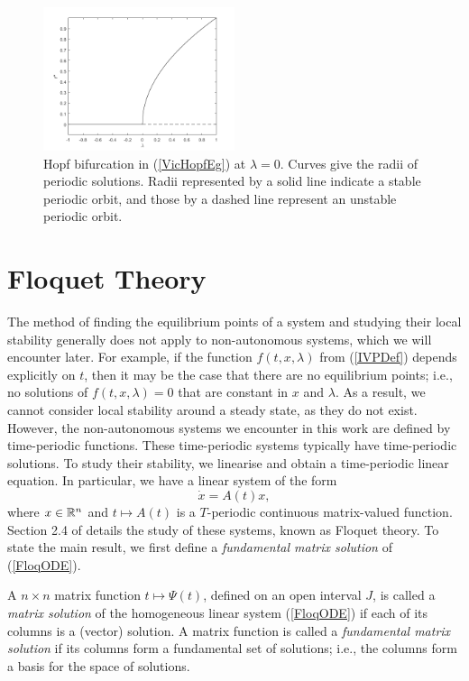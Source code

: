 \documentclass[12pt]{UOthesis}
\theoremstyle{remarkstyle}
\begin{document}
\begin{figure}[h!]
	\centering
	\includegraphics[width=0.5\textwidth]{BifH.png}
	\caption[Hopf bifurcation]{Hopf bifurcation in (\ref{VicHopfEg}) at $\lambda=0$. Curves give the radii of periodic solutions. Radii represented by a solid line indicate a stable periodic orbit, and those by a dashed line represent an unstable periodic orbit.\label{BifH}}
\end{figure}

\section{Floquet Theory}
\label{SectionFloquetTheory}
The method of finding the equilibrium points of a system and studying their local stability generally does not apply to non-autonomous systems, which we will encounter later. For example, if the function $f(t,x,\lambda)$ from (\ref{IVPDef}) depends explicitly on $t$, then it may be the case that there are no equilibrium points; i.e., no solutions of $f(t,x,\lambda)=0$ that are constant in $x$ and $\lambda$. As a result, we cannot consider local stability around a steady state, as they do not exist. However, the non-autonomous systems we encounter in this work are defined by time-periodic functions. These time-periodic systems typically have time-periodic solutions. To study their stability, we linearise and obtain a time-periodic linear equation. In particular, we have a linear system of the form
\begin{equation}
	\dot{x}=A(t)x,
	\label{FloqODE}
\end{equation}
where $x\in \mathbb R^n$ and $t\mapsto A(t)$ is a $T$-periodic continuous matrix-valued function. Section 2.4 of \cite{Chicone} details the study of these systems, known as Floquet theory. To state the main result, we first define a \textit{fundamental matrix solution} of (\ref{FloqODE}).

\begin{defn}
	A $n\times n$ matrix function $t\mapsto \Psi(t)$, defined on an open interval $J$, is called a \emph{matrix solution} of the homogeneous linear system (\ref{FloqODE}) if each of its columns is a (vector) solution. A matrix function is called a \emph{fundamental matrix solution} if its columns form a fundamental set of solutions; i.e., the columns form a basis for the space of solutions.
	\label{DefFundMatrixSoln}
\end{defn}
\end{document}
